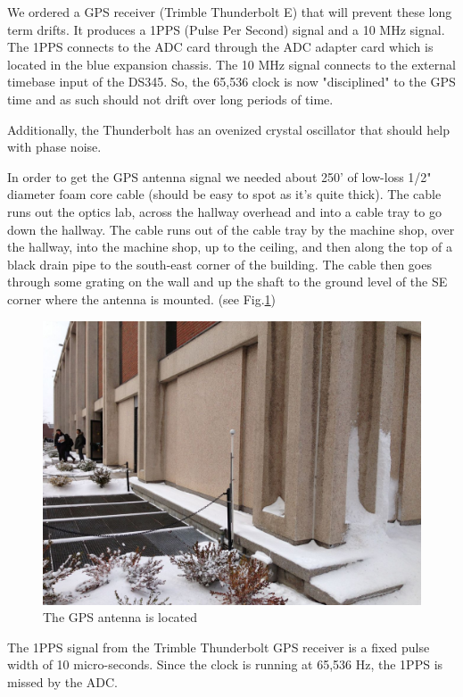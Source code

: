 We ordered a GPS receiver (Trimble Thunderbolt E) that will prevent these long term drifts. It produces a 1PPS (Pulse Per Second) signal and a 10 MHz signal. The 1PPS connects to the ADC card through the ADC adapter card which is located in the blue expansion chassis. The 10 MHz signal connects to the external timebase input of the DS345. So, the 65,536 clock is now "disciplined" to the GPS time and as such should not drift over long periods of time.

Additionally, the Thunderbolt has an ovenized crystal oscillator that should help with phase noise.

In order to get the GPS antenna signal we needed about 250' of low-loss 1/2" diameter foam core cable (should be easy to spot as it's quite thick). The cable runs out the optics lab, across the hallway overhead and into a cable tray to go down the hallway. The cable runs out of the cable tray by the machine shop, over the hallway, into the machine shop, up to the ceiling, and then along the top of a black drain pipe to the south-east corner of the building. The cable then goes through some grating on the wall and up the shaft to the ground level of the SE corner where the antenna is mounted. (see Fig.\ref{fig:gps_antenna})

\begin{figure}[htbp]
	\centering
		\includegraphics[width=15cm]{./figures/IMG_1308.jpg}
	\caption[GPS Antenna Location]{The GPS antenna is located }
	\label{fig:gps_antenna}
\end{figure}

The 1PPS signal from the Trimble Thunderbolt GPS receiver is a fixed pulse width of 10 micro-seconds. Since the clock is running at 65,536 Hz, the 1PPS is missed by the ADC.

